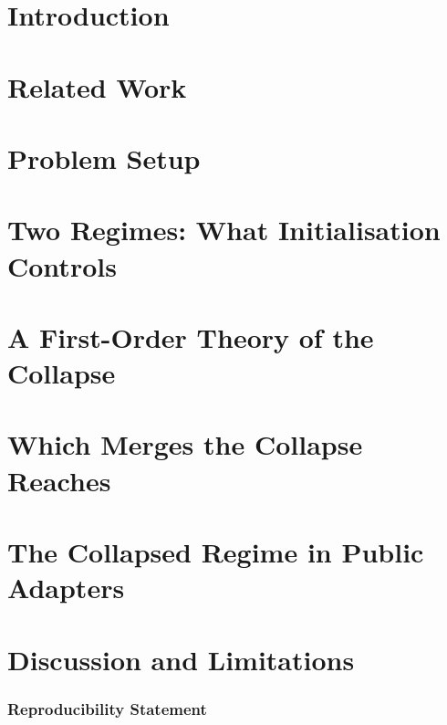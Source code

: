 \begin{abstract}

\end{abstract}
\fi\fi

\section{Introduction}\label{sec:intro}


\section{Related Work}\label{sec:related_work}


\section{Problem Setup}\label{sec:setup}



\section{Two Regimes: What Initialisation Controls}\label{sec:regimes}


\section{A First-Order Theory of the Collapse}\label{sec:drift-theory}


\section{Which Merges the Collapse Reaches}\label{sec:methods}\label{sec:exposure}


\section{The Collapsed Regime in Public Adapters}\label{sec:public}


\section{Discussion and Limitations}\label{sec:discussion}\label{sec:future}


\subsubsection*{Reproducibility Statement}


